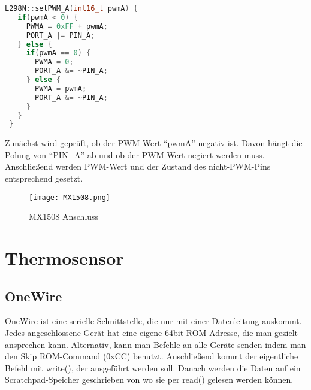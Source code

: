 \documentclass{article}
\begin{document}
\begin{file}[MX1508]
        \begin{lstlisting}[language=C++]
 L298N::setPWM_A(int16_t pwmA) {
   if(pwmA < 0) {
     PWMA = 0xFF + pwmA;
     PORT_A |= PIN_A;
   } else {
     if(pwmA == 0) {
       PWMA = 0;
       PORT_A &= ~PIN_A;
     } else {
       PWMA = pwmA;
       PORT_A &= ~PIN_A;
     }
   }
 }
        \end{lstlisting}
\end{file}

Zunächst wird geprüft, ob der PWM-Wert "`pwmA"'  negativ ist. Davon hängt die Polung von "`PIN\_A"' ab und ob der PWM-Wert negiert werden muss.
\newline
Anschließend werden PWM-Wert und der Zustand des nicht-PWM-Pins entsprechend gesetzt.

\begin{figure}[h]
	\texttt{[image: MX1508.png]}
	\centering
	\caption{MX1508 Anschluss \cite{MX1508}}
\end{figure} 


\newpage
\section{Thermosensor} %
\subsection{OneWire}
OneWire ist eine serielle Schnittstelle, die nur mit einer Datenleitung auskommt. Jedes angeschlossene Gerät hat eine eigene 64bit ROM Adresse, die man gezielt ansprechen kann. Alternativ, kann man Befehle an alle Geräte senden indem man den Skip ROM-Command (0xCC) benutzt. Anschließend kommt der eigentliche Befehl mit write(), der ausgeführt werden soll. Danach werden die Daten auf ein Scratchpad-Speicher geschrieben von wo sie per read() gelesen werden können.
\end{document}
